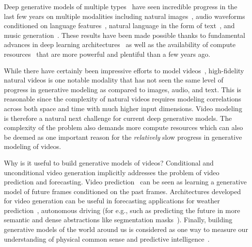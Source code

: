 \documentclass{article}
\begin{document}
Deep generative models of multiple types~\citep{kingma2013auto, goodfellow2014generative, oord2016pixel, dinh2016density} have seen incredible progress in the last few years on multiple modalities including natural images~\citep{oord2016conditional, zhang2019self, brock2018large, kingma2018glow, ho2019flow++, karras2017progressive,  karras2019style, van2017neural, razavi2019generating, vahdat2020nvae, ho2020denoising, chen2020generative, ramesh2021zero}, audio waveforms conditioned on language features~\citep{oord2016wavenet, oord2017parallel, prenger2019waveglow, binkowski2019high}, natural language in the form of text~\citep{radford2019language, brown2020language}, and music generation~\citep{dhariwal2020jukebox}. These results have been made possible thanks to fundamental advances in deep learning architectures~\citep{he2015deep, oord2016pixel, oord2016conditional, vaswani2017attention, zhang2019self, menick2018generating} as well as the availability of compute resources~\citep{jouppi2017datacenter, amodei2018ai} that are more powerful and plentiful than a few years ago. 


While there have certainly been impressive efforts to model videos~\cite{vondrick2016generating, kalchbrenner2016video, tulyakov2018mocogan, clark2019adversarial}, high-fidelity natural videos is one notable modality that has not seen the same level of progress in generative modeling as compared to images, audio, and text. This is reasonable since the complexity of natural videos requires modeling correlations across both space and time with much higher input dimensions. Video modeling is therefore a natural next challenge for current deep generative models. The complexity of the problem also demands more compute resources which can also be deemed as one important reason for the {\it relatively} slow progress in generative modeling of videos.


Why is it useful to build generative models of videos? Conditional and unconditional video generation implicitly addresses the problem of video prediction and forecasting. Video prediction~\citep{srivastava2015unsupervised, finn2016unsupervised, kalchbrenner2017video, sonderby2020metnet} can be seen as learning a generative model of future frames conditioned on the past frames. Architectures developed for video generation can be useful in forecasting applications for weather prediction~\cite{sonderby2020metnet}, autonomous driving (for e.g., such as predicting the future in more semantic and dense abstractions like segmentation masks~\citep{Luc_2017_ICCV}). Finally, building generative models of the world around us is considered as one way to measure our understanding of physical common sense and predictive intelligence~\citep{lake2015human}.
\end{document}
